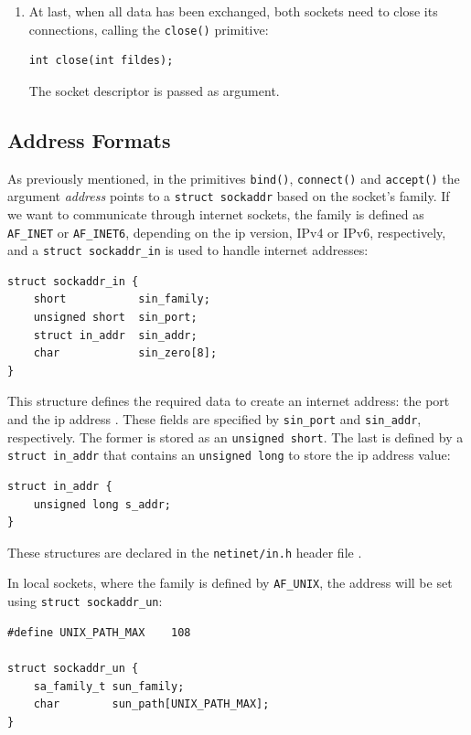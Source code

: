 \begin{enumerate}
\item At last, when all data has been exchanged, both sockets need to close its connections, calling the \texttt{close()} primitive:

\begin{lstlisting}[style=CInputStyle]
int close(int fildes);
\end{lstlisting}

The socket descriptor is passed as argument.
\end{enumerate}

\subsection{Address Formats}

As previously mentioned, in the primitives \texttt{bind()}, \texttt{connect()} and \texttt{accept()} the argument \textit{address} points to a \texttt{struct sockaddr} based on the socket's family. If we want to communicate through internet sockets, the family is defined as \texttt{AF\_INET} or \texttt{AF\_INET6}, depending on the \gls{ip} version, IPv4 or IPv6, respectively, and a \texttt{struct sockaddr\_in} is used to handle internet addresses:

\begin{lstlisting}[style=CInputStyle]
struct sockaddr_in {
    short			sin_family; 
    unsigned short	sin_port;
    struct in_addr	sin_addr; 
    char			sin_zero[8]; 
}
\end{lstlisting}

This structure defines the required data to create an internet address: the port and the \gls{ip} address \cite{IPSockets:Beej}. These fields are specified by \texttt{sin\_port} and \texttt{sin\_addr}, respectively. The former is stored as an \texttt{unsigned short}. The last is defined by a \texttt{struct in\_addr} that contains an \texttt{unsigned long} to store the \gls{ip} address value:

\begin{lstlisting}[style=CInputStyle]
struct in_addr {
    unsigned long s_addr;
}
\end{lstlisting}

These structures are declared in the \texttt{netinet/in.h} header file .

In local sockets, where the family is defined by \texttt{AF\_UNIX}, the address will be set using \texttt{struct sockaddr\_un}:

\begin{lstlisting}[style=CInputStyle]
#define UNIX_PATH_MAX    108

struct sockaddr_un {
    sa_family_t	sun_family;
    char		sun_path[UNIX_PATH_MAX];
}
\end{lstlisting}

